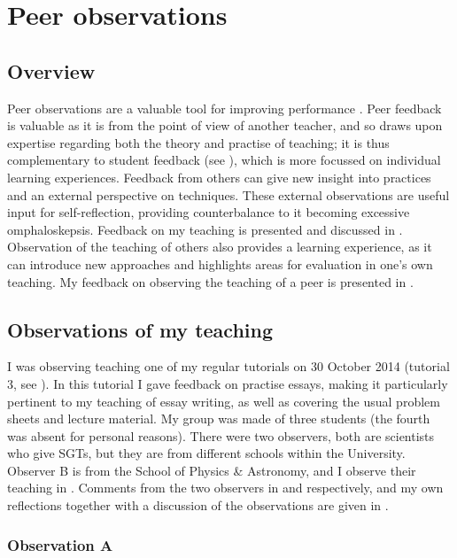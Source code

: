 \chapter{Peer observations}

\section{Overview}

Peer observations are a valuable tool for improving performance \citep{Ketteridge2015}.  Peer feedback is valuable as it is from the point of view of another teacher, and so draws upon expertise regarding both the theory and practise of teaching; it is thus complementary to student feedback (see ), which is more focussed on individual learning experiences. Feedback from others can give new insight into practices and an external perspective on techniques. These external observations are useful input for self-reflection, providing counterbalance to it becoming excessive omphaloskepsis. Feedback on my teaching is presented and discussed in . Observation of the teaching of others also provides a learning experience, as it can introduce new approaches and highlights areas for evaluation in one's own teaching. My feedback on observing the teaching of a peer is presented in .

\section{Observations of my teaching}\label{sec:me}

I was observing teaching one of my regular tutorials on 30 October 2014 (tutorial 3, see ). In this tutorial I gave feedback on practise essays, making it particularly pertinent to my teaching of essay writing, as well as covering the usual problem sheets and lecture material. My group was made of three students (the fourth was absent for personal reasons). There were two observers, both are scientists who give SGTs, but they are from different schools within the University. Observer B is from the School of Physics \& Astronomy, and I observe their teaching in . Comments from the two observers in  and  respectively, and my own reflections together with a discussion of the observations are given in .

\subsection{Observation A}\label{sec:me-A}

